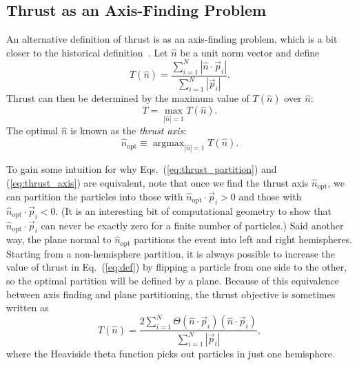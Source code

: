 \documentclass[aps,prd,twocolumn,superscriptaddress,preprintnumbers,nofootinbib,longbibliography,floatfix]{revtex4-1}
\DeclareRobustCommand{\Eq}[1]{Eq.~(\ref{#1})}
\DeclareRobustCommand{\Eqs}[2]{Eqs.~(\ref{#1}) and (\ref{#2})}
\DeclareMathOperator*{\argmax}{argmax}
\newcommand{\opt}{\text{opt}}
\begin{document}
\subsection{Thrust as an Axis-Finding Problem}
\label{subsec:thrustaxis}


An alternative definition of thrust is as an axis-finding problem, which is a bit closer to the historical definition~\cite{Brandt:1964sa,Farhi:1977sg}.
%
Let $\hat{n}$ be a unit norm vector and define
%
\begin{equation}
\label{eq:thrust_axis_finding}
T(\hat{n})=\frac{\sum_{i=1}^N|\hat{n}\cdot\vec{p}_i|}{\sum_{i=1}^N|\vec{p}_i|}.
\end{equation}
%
Thrust can then be determined by the maximum value of $T(\hat{n})$ over $\hat{n}$:
%
\begin{equation}
\label{eq:thrust_axis}
T = \max_{|\hat{n}|=1} T(\hat{n}).
\end{equation}
%
The optimal $\hat{n}$ is known as the \emph{thrust axis}:
%
\begin{equation}
\hat{n}_\opt \equiv \argmax_{|\hat{n}|=1} T(\hat{n}).
\end{equation}


To gain some intuition for why \Eqs{eq:thrust_partition}{eq:thrust_axis} are equivalent, note that once we find the thrust axis $\hat{n}_{\opt}$, we can partition the particles into those with $\hat{n}_{\opt} \cdot \vec{p}_i > 0$ and those with $\hat{n}_{\opt} \cdot \vec{p}_i < 0$.
%
(It is an interesting bit of computational geometry to show that $\hat{n}_{\opt} \cdot \vec{p}_i$ can never be exactly zero for a finite number of particles.)  
%
Said another way, the plane normal to $\hat{n}_{\opt}$ partitions the event into left and right hemispheres.
%
Starting from a non-hemisphere partition, it is always possible to increase the value of thrust in \Eq{eq:def} by flipping a particle from one side to the other, so the optimal partition will be defined by a plane.
%
Because of this equivalence between axis finding and plane partitioning, the thrust objective is sometimes written as
%
\begin{equation}
\label{eq:thrust_def_axis}
T(\hat{n})= \frac{2\sum_{i=1}^N\Theta(\hat{n}\cdot\vec{p}_i)(\hat{n}\cdot\vec{p}_i)}{\sum_{i=1}^N|\vec{p}_i|},
\end{equation}
%
where the Heaviside theta function picks out particles in just one hemisphere.
\end{document}
